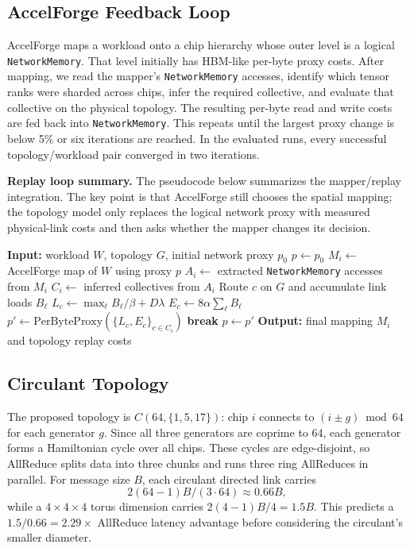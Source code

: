 \documentclass[conference]{IEEEtran}
\begin{document}
\subsection{AccelForge Feedback Loop}
AccelForge maps a workload onto a chip hierarchy whose outer level is a logical
\texttt{NetworkMemory}. That level initially has HBM-like per-byte proxy costs.
After mapping, we read the mapper's \texttt{NetworkMemory} accesses, identify
which tensor ranks were sharded across chips, infer the required collective, and
evaluate that collective on the physical topology. The resulting per-byte read
and write costs are fed back into \texttt{NetworkMemory}. This repeats until the
largest proxy change is below 5\% or six iterations are reached. In the
evaluated runs, every successful topology/workload pair converged in two
iterations.

\noindent\textbf{Replay loop summary.}
The pseudocode below summarizes the mapper/replay integration. The
key point is that AccelForge still chooses the spatial mapping; the topology
model only replaces the logical network proxy with measured physical-link
costs and then asks whether the mapper changes its decision.

\begin{algorithmic}[1]
\STATE \textbf{Input:} workload $W$, topology $G$, initial network proxy $p_0$
\STATE $p \leftarrow p_0$
    \STATE $M_i \leftarrow$ AccelForge map of $W$ using proxy $p$
    \STATE $A_i \leftarrow$ extracted \texttt{NetworkMemory} accesses from $M_i$
    \STATE $C_i \leftarrow$ inferred collectives from $A_i$
        \STATE Route $c$ on $G$ and accumulate link loads $B_{\ell}$
        \STATE $L_c \leftarrow \max_{\ell} B_{\ell}/\beta + D\lambda$
        \STATE $E_c \leftarrow 8\alpha\sum_{\ell} B_{\ell}$
    \ENDFOR
    \STATE $p' \leftarrow \text{PerByteProxy}(\{L_c,E_c\}_{c\in C_i})$
        \STATE \textbf{break}
    \ENDIF
    \STATE $p \leftarrow p'$
\ENDFOR
\STATE \textbf{Output:} final mapping $M_i$ and topology replay costs
\end{algorithmic}

\subsection{Circulant Topology}
The proposed topology is $C(64,\{1,5,17\})$: chip $i$ connects to
$(i \pm g) \bmod 64$ for each generator $g$. Since all three generators are
coprime to 64, each generator forms a Hamiltonian cycle over all chips. These
cycles are edge-disjoint, so AllReduce splits data into three chunks and runs
three ring AllReduces in parallel. For message size $B$, each circulant
directed link carries
\[
2(64-1)B/(3\cdot 64) \approx 0.66B,
\]
while a $4\times4\times4$ torus dimension carries $2(4-1)B/4 = 1.5B$.
This predicts a $1.5/0.66=2.29\times$ AllReduce latency advantage before
considering the circulant's smaller diameter.
\end{document}
